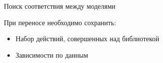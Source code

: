 \documentclass[12pt]{beamer}
\begin{document}
{
\begin{frame}[fragile]{Поиск соответствия между моделями}
  \begin{mybox}[]
  	\item При переносе необходимо сохранить:
  	  \begin{itemize}
  	  	\item Набор действий, совершенных над библиотекой
  	  	\item Зависимости по данным
  	  \end{itemize}
  \end{mybox}
\end{frame}
}
\end{document}
